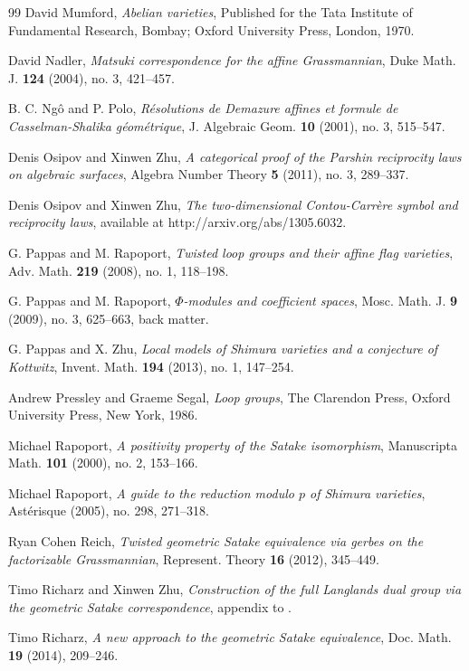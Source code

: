 \begin{thebibliography}{99}
 David Mumford, \emph{Abelian varieties}, Published for the Tata Institute of Fundamental Research, Bombay; Oxford University Press, London, 1970.

 David Nadler, \emph{Matsuki correspondence for the affine Grassmannian}, Duke Math. J. \textbf{124} (2004), no. 3, 421--457.

 B. C. Ng{\^o} and P. Polo, \emph{R\'esolutions de Demazure affines et formule de Casselman-Shalika g\'eom\'etrique}, J. Algebraic Geom. \textbf{10} (2001), no. 3, 515--547.

 Denis Osipov and Xinwen Zhu, \emph{A categorical proof of the Parshin reciprocity laws on algebraic surfaces}, Algebra Number Theory \textbf{5} (2011), no. 3, 289--337.

 Denis Osipov and Xinwen Zhu, \emph{The two-dimensional Contou-Carr\`ere symbol and reciprocity laws}, available at http://arxiv.org/abs/1305.6032.

 G. Pappas and M. Rapoport, \emph{Twisted loop groups and their affine flag varieties}, Adv. Math. \textbf{219} (2008), no. 1, 118--198.

 G. Pappas and M. Rapoport, \emph{$\Phi$-modules and coefficient spaces}, Mosc. Math. J. \textbf{9} (2009), no. 3, 625--663, back matter.

 G. Pappas and X. Zhu, \emph{Local models of Shimura varieties and a conjecture of Kottwitz}, Invent. Math. \textbf{194} (2013), no. 1, 147--254.

 Andrew Pressley and Graeme Segal, \emph{Loop groups}, The Clarendon Press, Oxford University Press, New York, 1986.

 Michael Rapoport, \emph{A positivity property of the Satake isomorphism}, Manuscripta Math. \textbf{101} (2000), no. 2, 153--166.

 Michael Rapoport, \emph{A guide to the reduction modulo $p$ of Shimura varieties}, Ast\'erisque (2005), no. 298, 271--318.

 Ryan Cohen Reich, \emph{Twisted geometric Satake equivalence via gerbes on the factorizable Grassmannian}, Represent. Theory \textbf{16} (2012), 345--449.

 Timo Richarz and Xinwen Zhu, \emph{Construction of the full Langlands dual group via the geometric Satake correspondence}, appendix to \cite{Z11}.

 Timo Richarz, \emph{A new approach to the geometric Satake equivalence}, Doc. Math. \textbf{19} (2014), 209--246.


\end{thebibliography}
